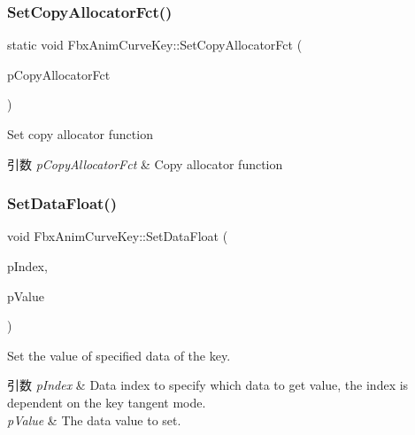 \subsubsection{\texorpdfstring{Set\+Copy\+Allocator\+Fct()}{SetCopyAllocatorFct()}}
{\footnotesize\ttfamily static void Fbx\+Anim\+Curve\+Key\+::\+Set\+Copy\+Allocator\+Fct (\begin{DoxyParamCaption}\item[{\hyperlink{class_fbx_anim_curve_key___impl}{Fbx\+Anim\+Curve\+Key\+\_\+\+Impl} $\ast$($\ast$)(\hyperlink{class_fbx_anim_curve_key___impl}{Fbx\+Anim\+Curve\+Key\+\_\+\+Impl} $\ast$)}]{p\+Copy\+Allocator\+Fct }\end{DoxyParamCaption})\hspace{0.3cm}{\ttfamily [static]}}

Set copy allocator function 
\begin{DoxyParams}{引数}
{\em p\+Copy\+Allocator\+Fct} & Copy allocator function \\
\hline
\end{DoxyParams}
\mbox{\label{class_fbx_anim_curve_key_ad61a4843c52e4ba3a21102c577950dc5}} 
\subsubsection{\texorpdfstring{Set\+Data\+Float()}{SetDataFloat()}}
{\footnotesize\ttfamily void Fbx\+Anim\+Curve\+Key\+::\+Set\+Data\+Float (\begin{DoxyParamCaption}\item[{\hyperlink{class_fbx_anim_curve_def_a3be261d961f8226235529b148cf80300}{Fbx\+Anim\+Curve\+Def\+::\+E\+Data\+Index}}]{p\+Index,  }\item[{float}]{p\+Value }\end{DoxyParamCaption})}

Set the value of specified data of the key. 
\begin{DoxyParams}{引数}
{\em p\+Index} & Data index to specify which data to get value, the index is dependent on the key tangent mode. \\
\hline
{\em p\+Value} & The data value to set.\\
\hline
\end{DoxyParams}

